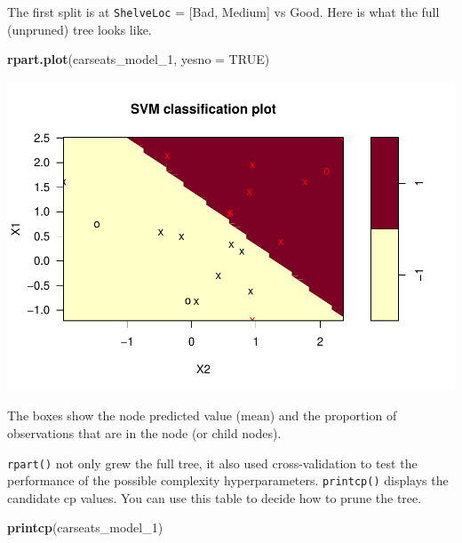 \documentclass[
]{book}
\newenvironment{Shaded}{\begin{snugshade}}{\end{snugshade}}
\newcommand{\DataTypeTok}[1]{\textcolor[rgb]{0.13,0.29,0.53}{#1}}
\newcommand{\DecValTok}[1]{\textcolor[rgb]{0.00,0.00,0.81}{#1}}
\newcommand{\KeywordTok}[1]{\textcolor[rgb]{0.13,0.29,0.53}{\textbf{#1}}}
\newcommand{\NormalTok}[1]{#1}
\newcommand{\OtherTok}[1]{\textcolor[rgb]{0.56,0.35,0.01}{#1}}
\begin{document}
The first split is at \texttt{ShelveLoc} = {[}Bad, Medium{]} vs Good. Here is what the full (unpruned) tree looks like.

\begin{Shaded}
\begin{Highlighting}[]
\KeywordTok{rpart.plot}\NormalTok{(carseats_model_}\DecValTok{1}\NormalTok{, }\DataTypeTok{yesno =} \OtherTok{TRUE}\NormalTok{)}
\end{Highlighting}
\end{Shaded}

\includegraphics{data-sci_files/figure-latex/unnamed-chunk-96-1.pdf}

The boxes show the node predicted value (mean) and the proportion of observations that are in the node (or child nodes).

\texttt{rpart()} not only grew the full tree, it also used cross-validation to test the performance of the possible complexity hyperparameters. \texttt{printcp()} displays the candidate cp values. You can use this table to decide how to prune the tree.

\begin{Shaded}
\begin{Highlighting}[]
\KeywordTok{printcp}\NormalTok{(carseats_model_}\DecValTok{1}\NormalTok{)}
\end{Highlighting}
\end{Shaded}
\end{document}
